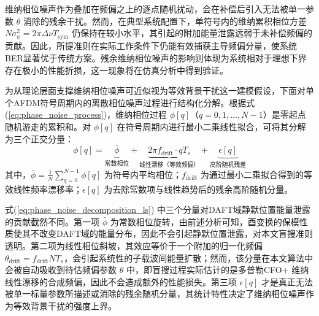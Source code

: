 维纳相位噪声作为叠加在频偏之上的逐点随机扰动，会在补偿后引入无法被单一参数 $\theta$ 消除的残余干扰。然而，在典型系统配置下，单符号内的维纳累积相位方差 $N\sigma_\phi^2 = 2\pi\Delta\nu T_{\mathrm{sym}}$ 仍保持在较小水平，其引起的附加能量泄露远弱于未补偿频偏的贡献。因此，所提准则在实际工作条件下仍能有效捕获主导频偏分量，使系统BER显著优于传统方案。残余维纳相位噪声的影响则体现为系统相对于理想下界存在极小的性能折损，这一现象将在仿真分析中得到验证。

为从理论层面支撑维纳相位噪声可近似视为等效背景干扰这一建模假设，下面对单个AFDM符号周期内的离散相位噪声过程进行结构化分解。根据式(\ref{eq:phase_noise_process})，维纳相位过程 $\phi[q]$（$q=0,1,\ldots,N-1$）是零起点随机游走的累积和。对 $\phi[q]$ 在符号周期内进行最小二乘线性拟合，可将其分解为三个正交分量：
\begin{equation}
    \phi[q] = \underbrace{\bar{\phi}}_{\text{常数相位}} + \underbrace{2\pi f_{\mathrm{drift}} \cdot q T_s}_{\text{线性漂移（等效频偏）}} + \underbrace{\epsilon[q]}_{\text{高阶随机残差}}
    \label{eq:phase_noise_decomposition_ls}
\end{equation}
其中，$\bar{\phi}=\frac{1}{N}\sum_{q=0}^{N-1}\phi[q]$ 为符号内平均相位；$f_{\mathrm{drift}}$ 为通过最小二乘拟合得到的等效线性频率漂移率；$\epsilon[q]$ 为去除常数项与线性趋势后的残余高阶随机分量。

式(\ref{eq:phase_noise_decomposition_ls}) 中三个分量对DAFT域静默位置能量泄露的贡献截然不同。第一项 $\bar{\phi}$ 为常数相位旋转，由前述分析可知，酉变换的保模性质使其不改变DAFT域的能量分布，因此不会引起静默位置泄露，对本文盲搜准则透明。第二项为线性相位斜坡，其效应等价于一个附加的归一化频偏 $\theta_{\mathrm{drift}}=f_{\mathrm{drift}} N T_s$，会引起系统性的子载波间能量扩散；然而，该分量在本文算法中会被自动吸收到待估频偏参数 $\theta$ 中，即盲搜过程实际估计的是多普勒CFO+ 维纳线性漂移的合成频偏，因此不会造成额外的性能损失。第三项 $\epsilon[q]$ 才是真正无法被单一标量参数所描述或消除的残余随机分量，其统计特性决定了维纳相位噪声作为等效背景干扰的强度上界。

